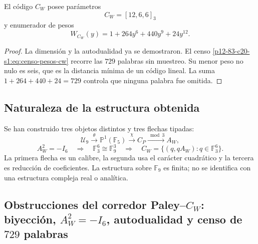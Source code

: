 \begin{theorem}
\label{p12-83-c20-s1:thm:enumerador-cw-autonomo}
El código \(C_W\) posee parámetros
\[
 \boxed{C_W=[12,6,6]_3}
\]
y enumerador de pesos
\begin{equation}
 \boxed{W_{C_W}(y)=1+264y^6+440y^9+24y^{12}.}
 \label{p12-83-c20-s1:eq:enumerador-pesos-cw}
\end{equation}
\end{theorem}

\begin{proof}
La dimensión y la autodualidad ya se demostraron. El censo
\eqref{p12-83-c20-s1:eq:censo-pesos-cw} recorre las \(729\) palabras sin muestreo. Su
menor peso no nulo es seis, que es la distancia mínima de un código lineal.
La suma \(1+264+440+24=729\) controla que ninguna palabra fue omitida.
\end{proof}

\subsection{Naturaleza de la estructura obtenida}

Se han construido tres objetos distintos y tres flechas tipadas:
\[
 \mathcal U_9
 \xrightarrow{\theta}\mathbb P^1(\mathbb F_5)
 \xrightarrow{\chi}C_P
 \xrightarrow{\bmod3}A_W,
\]
\[
 A_W^2=-I_6
 \quad\Longrightarrow\quad
 \mathbb F_3^6\cong\mathbb F_9^3
 \quad\Longrightarrow\quad
 C_W=\{(q,qA_W):q\in\mathbb F_3^6\}.
\]
La primera flecha es un calibre, la segunda usa el carácter cuadrático y la
tercera es reducción de coeficientes. La estructura sobre
\(\mathbb F_9\) es finita; no se identifica con una estructura compleja
real o analítica.

\subsection{Obstrucciones del corredor Paley–\(C_W\): biyección, \(A_W^2=-I_6\), autodualidad y censo de \(729\) palabras}

